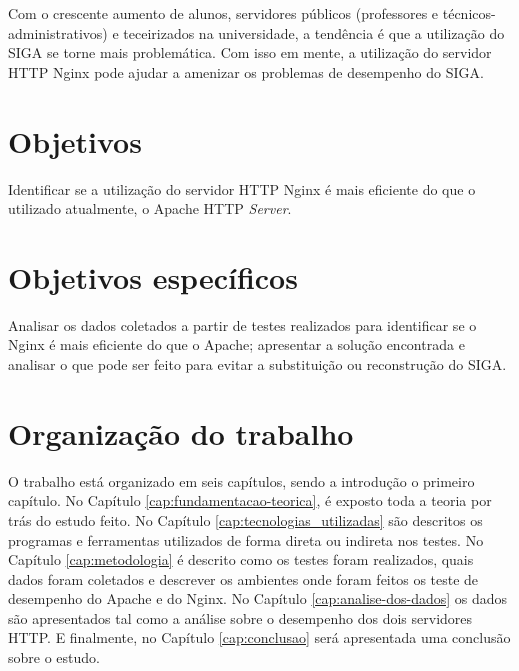 Com o crescente aumento de alunos, servidores públicos (professores e 
técnicos-administrativos) e teceirizados na universidade, a tendência é que a 
utilização do SIGA se torne mais problemática.
Com isso em mente, a utilização do servidor HTTP Nginx pode ajudar a amenizar 
os problemas de desempenho do SIGA.

\section{Objetivos}

Identificar se a utilização do servidor HTTP Nginx é mais eficiente do que o 
utilizado atualmente, o Apache HTTP \textit{Server}.

\section{Objetivos específicos}

Analisar os dados coletados a partir de testes realizados para identificar se o 
Nginx é mais eficiente do que o Apache; apresentar a solução encontrada e 
analisar o que pode ser feito para evitar a substituição ou reconstrução do 
SIGA.

\section{Organização do trabalho}
O trabalho está organizado em seis capítulos, sendo a introdução o primeiro 
capítulo.
No Capítulo \ref{cap:fundamentacao-teorica}, é exposto toda a teoria por 
trás do estudo feito. No Capítulo \ref{cap:tecnologias_utilizadas} são 
descritos os programas e ferramentas utilizados de forma direta ou indireta nos 
testes. No Capítulo \ref{cap:metodologia} é descrito como os testes foram 
realizados, quais dados foram coletados e descrever os ambientes onde foram 
feitos os teste de desempenho do Apache e do Nginx. No Capítulo 
\ref{cap:analise-dos-dados} os dados são apresentados tal como a análise sobre 
o desempenho dos dois servidores HTTP. E 
finalmente, no Capítulo \ref{cap:conclusao} será apresentada uma conclusão 
sobre o estudo.

